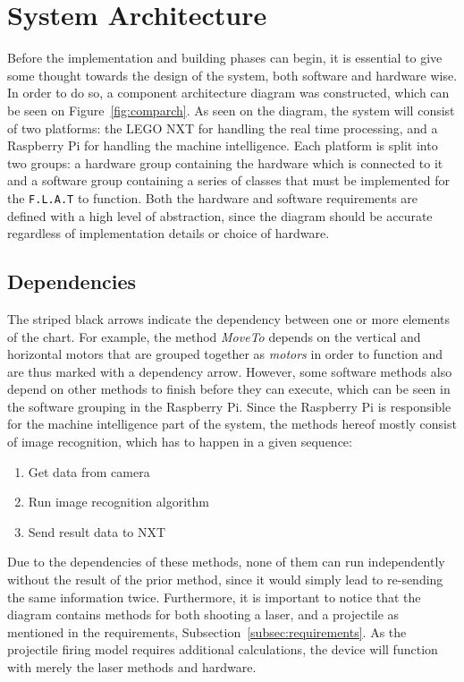 \section{System Architecture}
\label{sec:architecture}
Before the implementation and building phases can begin, it is essential to give some thought towards the design of the system, both software and hardware wise.
In order to do so, a component architecture diagram was constructed, which can be seen on Figure~\ref{fig:comparch}.
As seen on the diagram, the system will consist of two platforms: the LEGO NXT for handling the real time processing, and a Raspberry Pi for handling the machine intelligence.
Each platform is split into two groups: a hardware group containing the hardware which is connected to it and a software group containing a series of classes that must be implemented for the \texttt{F.L.A.T} to function.
Both the hardware and software requirements are defined with a high level of abstraction, since the diagram should be accurate regardless of implementation details or choice of hardware.

\subsection*{Dependencies}
The striped black arrows indicate the dependency between one or more elements of the chart.
For example, the method \textit{MoveTo} depends on the vertical and horizontal motors that are grouped together as \textit{motors} in order to function and are thus marked with a dependency arrow.
However, some software methods also depend on other methods to finish before they can execute, which can be seen in the software grouping in the Raspberry Pi.
Since the Raspberry Pi is responsible for the machine intelligence part of the system, the methods hereof mostly consist of image recognition, which has to happen in a given sequence:
\begin{enumerate}
\item Get data from camera
\item Run image recognition algorithm
\item Send result data to NXT
\end{enumerate}

Due to the dependencies of these methods, none of them can run independently without the result of the prior method, since it would simply lead to re-sending the same information twice.
Furthermore, it is important to notice that the diagram contains methods for both shooting a laser, and a projectile as mentioned in the requirements, Subsection~\ref{subsec:requirements}.
As the projectile firing model requires additional calculations, the device will function with merely the laser methods and hardware. 

